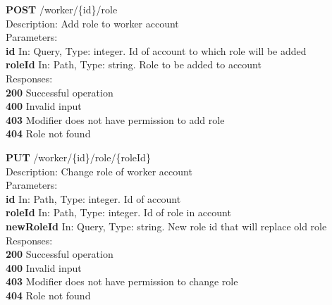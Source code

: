 \documentclass[11pt,a4paper,pdftex]{article}
\begin{document}
\hspace*{1em}\textbf{POST} /worker/\{id\}/role\\
\hspace*{2em}Description: Add role to worker account\\
\hspace*{2em}Parameters:\\
\hspace*{3em}\textbf{id} In: Query, Type: integer. Id of account to which role will be added\\
\hspace*{3em}\textbf{roleId} In: Path, Type: string. Role to be added to account\\
\hspace*{2em}Responses:\\
\hspace*{3em}\textbf{200} Successful operation\\
\hspace*{3em}\textbf{400} Invalid input\\
\hspace*{3em}\textbf{403} Modifier does not have permission to add role\\
\hspace*{3em}\textbf{404} Role not found

\hspace*{1em}\textbf{PUT} /worker/\{id\}/role/\{roleId\}\\
\hspace*{2em}Description: Change role of worker account\\
\hspace*{2em}Parameters:\\
\hspace*{3em}\textbf{id} In: Path, Type: integer. Id of account\\
\hspace*{3em}\textbf{roleId} In: Path, Type: integer. Id of role in account\\
\hspace*{3em}\textbf{newRoleId} In: Query, Type: string. New role id that will replace old role\\
\hspace*{2em}Responses:\\
\hspace*{3em}\textbf{200} Successful operation\\
\hspace*{3em}\textbf{400} Invalid input\\
\hspace*{3em}\textbf{403} Modifier does not have permission to change role\\
\hspace*{3em}\textbf{404} Role not found
\end{document}

